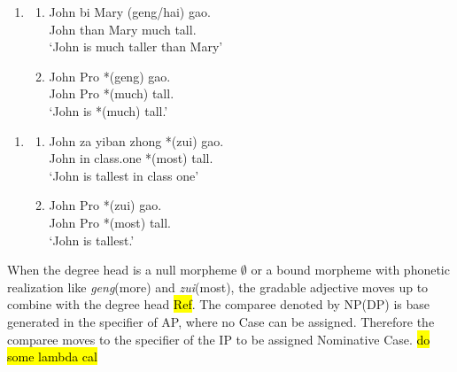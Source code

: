 \documentclass{ctexart}
\begin{document}
\begin{enumerate}
    \item \label{superiority_example_3}
    \begin{enumerate}
        \item \label{superiority_example_3_a}
        John bi Mary (geng/hai) gao. \\
        John than Mary much tall. \\
        `John is much taller than Mary'

        \item \label{superiority_example_3_b}
        John Pro *(geng) gao. \\
        John Pro *(much) tall.  \\
        `John is *(much) tall.'

    \end{enumerate}
\end{enumerate}

\begin{enumerate}
    \item \label{superiority_example_4}
    \begin{enumerate}
        \item \label{superiority_example_4_a}
        John za yiban zhong *(zui) gao. \\
        John in class.one *(most) tall. \\
        `John is tallest in class one'

        \item \label{superiority_example_4_b}
        John Pro *(zui) gao. \\
        John Pro *(most) tall.  \\
        `John is tallest.'

    \end{enumerate}
\end{enumerate}

When the degree head is a null morpheme $\emptyset$ or a bound morpheme with phonetic realization like \textit{geng}(more) and \textit{zui}(most), the gradable adjective moves up to combine with the degree head \hl{Ref}. The comparee denoted by NP(DP) is base generated in the specifier of AP, where no Case can be assigned. Therefore the comparee moves to the specifier of the IP to be assigned Nominative Case. \hl{do some lambda cal}
\end{document}
